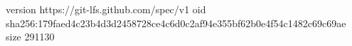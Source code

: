version https://git-lfs.github.com/spec/v1
oid sha256:179faed4c23b4d3d2458728ce4c6d0c2af94e355bf62b0e4f54c1482c69c69ae
size 291130

